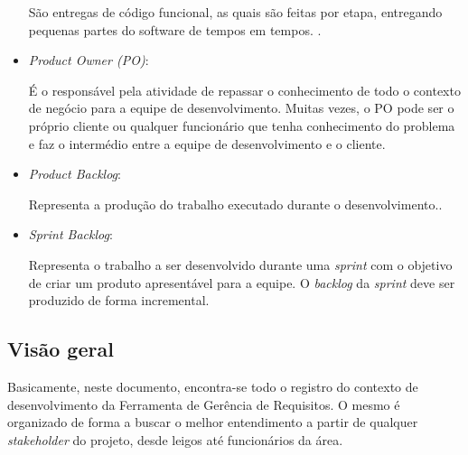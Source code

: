 \begin{itemize}
		São entregas de código funcional, as quais são feitas por etapa, entregando pequenas partes do software de tempos em tempos. \cite{beck2000extreme}.

	\item \textit{Product Owner (PO)}:

		É o responsável pela atividade de repassar o conhecimento de todo o contexto de negócio para a equipe de desenvolvimento. Muitas vezes, o PO pode ser o próprio cliente ou qualquer funcionário que tenha conhecimento do problema e faz o intermédio entre a equipe de desenvolvimento e o cliente. \cite{beck2000extreme}

	\item \textit{Product Backlog}:

		Representa a produção do trabalho executado durante o desenvolvimento.\cite{sanches2010aplicaccao}.

	\item \textit{Sprint Backlog}:

		Representa o trabalho a ser desenvolvido durante uma \textit{sprint} com o objetivo de criar um produto apresentável para a equipe. O \textit{backlog} da \textit{sprint} deve ser produzido de forma incremental.

\end{itemize}

\subsection{Visão geral}

Basicamente, neste documento, encontra-se todo o registro do contexto de desenvolvimento da Ferramenta de Gerência de Requisitos. O mesmo é organizado de forma a buscar o melhor entendimento a partir de qualquer \textit{stakeholder} do projeto, desde leigos até funcionários da área.


